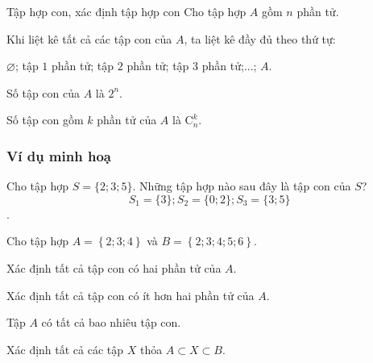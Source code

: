\begin{dang}{Tập hợp con, xác định tập hợp con}
	Cho tập hợp $A$ gồm $n$ phần tử.
	\begin{enumEX}{1}
		\item  Khi liệt kê tất cả các tập con của $A$, ta liệt kê đầy đủ theo thứ tự:\\		
		\centerline{ $\varnothing$; tập $1$ phần tử; tập $2$ phần tử; tập $3$ phần tử;...; $A$.}
		\item  Số tập con của $A$ là $2^n$.
		\item  Số tập con gồm $k$ phần tử của $A$ là $\mathrm{C}_n^k$.
	\end{enumEX}
\end{dang}
\subsubsection{Ví dụ minh hoạ}
\begin{vd}%
	Cho tập hợp $S=\{2 ; 3 ; 5\}$. Những tập hợp nào sau đây là tập con của $S$?
	$$S_{1}=\{3\};S_{2}=\{0 ; 2\}; S_{3}=\{3 ; 5\}$$.
\end{vd}

\begin{vd}%
	Cho tập hợp $A=\left\{2;3;4\right\}$ và $B=\left\{2;3;4;5;6\right\}$.
	\begin{enumEX}{1}
		\item Xác định tất cả tập con có hai phần tử của $A$.
		\item Xác định tất cả tập con có ít hơn hai phần tử của $A$.
		\item Tập $A$ có tất cả bao nhiêu tập con.
		\item Xác định tất cả các tập $X$ thỏa $A \subset X \subset B$.
	\end{enumEX}
\end{vd}
